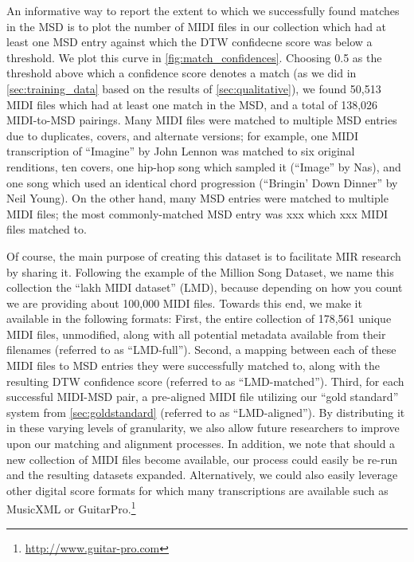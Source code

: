 An informative way to report the extent to which we successfully found matches in the MSD is to plot the number of MIDI files in our collection which had at least one MSD entry against which the DTW confidecne score was below a threshold.
We plot this curve in \cref{fig:match_confidences}.
Choosing 0.5 as the threshold above which a confidence score denotes a match (as we did in \cref{sec:training_data} based on the results of \cref{sec:qualitative}), we found 50,513 MIDI files which had at least one match in the MSD, and a total of 138,026 MIDI-to-MSD pairings.
Many MIDI files were matched to multiple MSD entries due to duplicates, covers, and alternate versions; for example, one MIDI transcription of ``Imagine'' by John Lennon was matched to six original renditions, ten covers, one hip-hop song which sampled it (``Image'' by Nas), and one song which used an identical chord progression (``Bringin' Down Dinner'' by Neil Young).
On the other hand, many MSD entries were matched to multiple MIDI files; the most commonly-matched MSD entry was xxx which xxx MIDI files matched to.


Of course, the main purpose of creating this dataset is to facilitate MIR research by sharing it.
Following the example of the Million Song Dataset, we name this collection the ``lakh MIDI dataset'' (LMD), because depending on how you count we are providing about 100,000 MIDI files.
Towards this end, we make it available in the following formats:
First, the entire collection of 178,561 unique MIDI files, unmodified, along with all potential metadata available from their filenames (referred to as ``LMD-full'').
Second, a mapping between each of these MIDI files to MSD entries they were successfully matched to, along with the resulting DTW confidence score (referred to as ``LMD-matched'').
Third, for each successful MIDI-MSD pair, a pre-aligned MIDI file utilizing our ``gold standard'' system from \cref{sec:goldstandard} (referred to as ``LMD-aligned'').
By distributing it in these varying levels of granularity, we also allow future researchers to improve upon our matching and alignment processes.
In addition, we note that should a new collection of MIDI files become available, our process could easily be re-run and the resulting datasets expanded.
Alternatively, we could also easily leverage other digital score formats for which many transcriptions are available such as MusicXML \cite{good2001musicxml} or GuitarPro.\footnote{\url{http://www.guitar-pro.com}}

